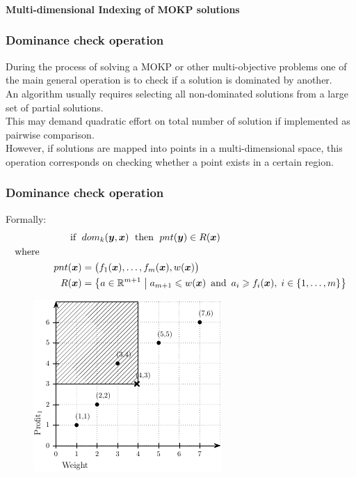 
%
\begin{frame}
\frametitle{}
\begin{center}
  \textbf{\Large Multi-dimensional Indexing of MOKP solutions}
\end{center}
\end{frame}

%
\begin{frame}
\frametitle{Dominance check operation}
During the process of solving a MOKP or other multi-objective problems
one of the main general operation is to check if a solution is dominated
by another. \\
\pause \bigskip
An algorithm usually requires selecting all non-dominated solutions
from a large set of partial solutions. \\
\pause \bigskip
This may demand quadratic effort on total number of solution if implemented
as pairwise comparison. \\
\pause \bigskip
However, if solutions are mapped into points in a multi-dimensional space,
this operation corresponds on checking whether a point exists in a certain region.
\end{frame}

%
\begin{frame}
\frametitle{Dominance check operation}
Formally:
\begin{align*}
    \text{ if } \; &dom_k(\boldsymbol{y}, \boldsymbol{x}) \; \text{ then } \; pnt(\boldsymbol{y}) \in R(\boldsymbol{x}) \\
  \text{where} \phantom{mmmmm} \\
    pnt(\boldsymbol{x}) &= \big(f_{1}(\boldsymbol{x}), \ldots, f_{m}(\boldsymbol{x}), w(\boldsymbol{x})\big) \\
    R(\boldsymbol{x}) &= \left\{ a \in \mathbb{R}^{m+1} \;\middle|\;
      a_{m+1} \leqslant w(\boldsymbol{x})
      \, \text{ and } \,
      a_i \geqslant f_{i}(\boldsymbol{x}), \; i \in \{1, \ldots, m\}
      \right\}
\end{align*} \pause
\begin{figure}
  \centering
  \includegraphics[scale=0.8]{img/kdt/dom}
\end{figure}
\end{frame}

